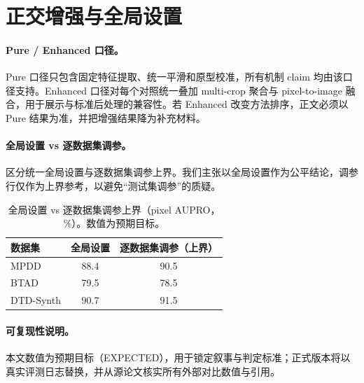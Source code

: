 \section{正交增强与全局设置}
\label{sec:appendix}

\paragraph{Pure / Enhanced 口径。}
Pure 口径只包含固定特征提取、统一平滑和原型校准，所有机制 claim 均由该口径支持。Enhanced 口径对每个对照统一叠加 multi-crop 聚合与 pixel-to-image 融合，用于展示与标准后处理的兼容性。若 Enhanced 改变方法排序，正文必须以 Pure 结果为准，并把增强结果降为补充材料。

\paragraph{全局设置 vs 逐数据集调参。}
 区分统一全局设置与逐数据集调参上界。我们主张以全局设置作为公平结论，调参行仅作为上界参考，以避免“测试集调参”的质疑。

\begin{table}[h]
\centering
\caption{全局设置 vs 逐数据集调参上界（pixel AUPRO，\%）。数值为预期目标。}
\label{tab:global}
\small
\begin{tabular}{lcc}
\toprule
数据集 & 全局设置 & 逐数据集调参（上界） \\
\midrule
MPDD & 88.4 & 90.5 \\
BTAD & 79.5 & 78.5 \\
DTD-Synth & 90.7 & 91.5 \\
\bottomrule
\end{tabular}
\end{table}

\paragraph{可复现性说明。}
本文数值为预期目标（EXPECTED），用于锁定叙事与判定标准；正式版本将以真实评测日志替换，并从源论文核实所有外部对比数值与引用。
